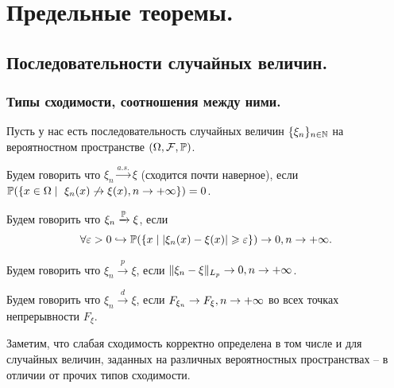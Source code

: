 \section{Предельные теоремы.}
\subsection{Последовательности случайных величин.}
\subsubsection{Типы сходимости, соотношения между ними.}
Пусть у нас есть последовательность случайных величин $\{\xi_n\}_{n \in \N}$ на вероятностном пространстве $(\Omega, \mathcal{F}, \P)$.
\begin{definition}
    Будем говорить что $\xi_n \xrightarrow{a.s.} \xi$ (сходится почти наверное), если $\P(\{x \in \Omega \mid \  \xi_n(x) \not\ra \xi(x), n \ra +\infty\}) = 0$.
\end{definition}
\begin{definition}
    Будем говорить что $\xi_n \xrightarrow{\P} \xi$, если \[\forall \epsilon > 0 \hookrightarrow \P(\{x \mid |\xi_n(x) - \xi(x)| \geq \epsilon \}) \ra 0, n \ra +\infty.\]
\end{definition}
\begin{definition}
    Будем говорить что $\xi_n \xrightarrow{p} \xi$, если $\|\xi_n - \xi\|_{L_p} \ra 0, n \ra +\infty$.
\end{definition}
\begin{definition}
    Будем говорить что $\xi_n \xrightarrow{d} \xi$, если $F_{\xi_n} \ra F_{\xi}, n \ra +\infty$ во всех точках непрерывности $F_{\xi}$.
\end{definition}
\begin{note}
    Заметим, что слабая сходимость корректно определена в том числе и для случайных величин, заданных на различных вероятностных пространствах -- в отличии от прочих типов сходимости.
\end{note}
